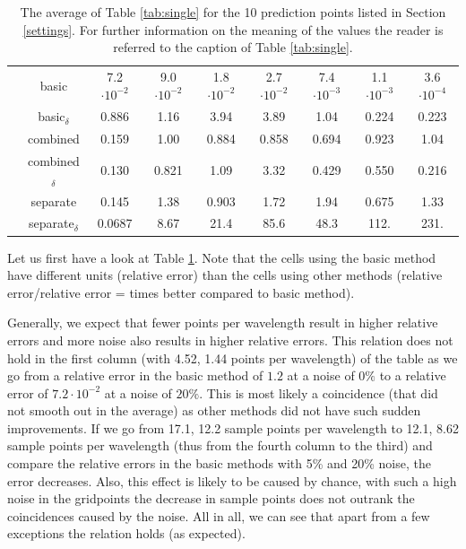 \begin{table}[H]
\begin{tabular}{|c|c|ccccccc|}
        \rowcolor[gray]{.9}
        \cellcolor{white}
        & basic & 7.2$\cdot 10^{-2}$ & 9.0$\cdot 10^{-2}$ & 1.8$\cdot 10^{-2}$ & 2.7$\cdot 10^{-2}$ & 7.4$\cdot 10^{-3}$ & 1.1$\cdot 10^{-3}$ & 3.6$\cdot 10^{-4 }$ \\
        \cline{2-9}
        \cellcolor{white}
        & basic$_\delta$ & 0.886 & 1.16 & 3.94 & 3.89 & 1.04 & 0.224 & 0.223 \\
        \cellcolor{white}
        & combined & 0.159 & 1.00 & 0.884 & 0.858 & 0.694 & 0.923 & 1.04 \\
        \cellcolor{white}
        & combined$_\delta$ & 0.130 & 0.821 & 1.09 & 3.32 & 0.429 & 0.550 & 0.216 \\
        \cellcolor{white}
        & separate & 0.145 & 1.38 & 0.903 & 1.72 & 1.94 & 0.675 & 1.33 \\
        \cellcolor{white}
        \multirow{-6}{*}{20\%}
        & separate$_\delta$ & 0.0687 & 8.67 & 21.4 & 85.6 & 48.3 & 112. & 231. \\
        \hline
    \end{tabular}
    \caption{The average of Table \ref{tab:single} for the 10 prediction points listed in Section \ref{settings}. For further information on the meaning of the values the reader is referred to the caption of Table \ref{tab:single}.}
    \label{tab:average}
\end{table}

Let us first have a look at Table \ref{tab:average}.
Note that the cells using the basic method have different units (relative error) than the cells using other methods (relative error/relative error = times better compared to basic method).

Generally, we expect that fewer points per wavelength result in higher relative errors and more noise also results in higher relative errors.
This relation does not hold in the first column (with 4.52, 1.44 points per wavelength) of the table as we go from a relative error in the basic method of $1.2$ at a noise of $0\%$ to a relative error of $7.2\cdot 10^{-2}$ at a noise of $20\%$.
This is most likely a coincidence (that did not smooth out in the average) as other methods did not have such sudden improvements.
If we go from 17.1, 12.2 sample points per wavelength to 12.1, 8.62 sample points per wavelength (thus from the fourth column to the third) and compare the relative errors in the basic methods with 5\% and 20\% noise, the error decreases.
Also, this effect is likely to be caused by chance, with such a high noise in the gridpoints the decrease in sample points does not outrank the coincidences caused by the noise.
All in all, we can see that apart from a few exceptions the relation holds (as expected).

